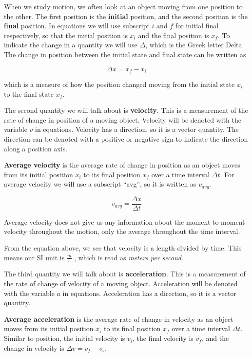 \documentclass[12pt]{book}
\begin{document}
When we study motion, we often look at an object moving from one position to the other. The first position is the \textbf{initial} position, and the second position is the \textbf{final} position. In equations we will use subscript $i$ and $f$ for initial final respectively, so that the initial position is $x_i$ and the final position is $x_f$. To indicate the change in a quantity we will use $\Delta$, which is the Greek letter Delta. The change in position between the initial state and final state can be written as

\begin{equation}
\Delta x = x_f - x_i
\end{equation}

which is a measure of how the position changed moving from the initial state $x_i$ to the final state $x_f$. 

The second quantity we will talk about is \textbf{velocity}. This is a measurement of the rate of change in position of a moving object.  Velocity will be denoted with the variable $v$ in equations. Velocity has a direction, so it is a vector quantity. The direction can be denoted with a positive or negative sign to indicate the direction along a position axis.

\textbf{Average velocity} is the average rate of change in position as an object moves from its initial position $x_i$ to its final position $x_f$ over a time interval $\Delta t$. For average velocity we will use a subscript ``avg'', so it is written as $v_{avg}$. 

\begin{equation}
v_{avg} = \frac{\Delta x}{\Delta t}
\end{equation}

Average velocity does not give us any information about the moment-to-moment velocity throughout the motion, only the average throughout the time interval.

From the equation above, we see that velocity is a length divided by time. This means our SI unit is $\frac{m}{s}$ , which is read as \textit{meters per second}. 

The third quantity we will talk about is \textbf{acceleration}. This is a measurement of the rate of change of velocity of a moving object. Acceleration will be denoted with the variable $a$ in equations. Acceleration has a direction, so it is a vector quantity. 

\textbf{Average acceleration} is the average rate of change in velocity as an object moves from its initial position $x_i$ to its final position $x_f$ over a time interval $\Delta t$. Similar to position, the initial velocity is $v_i$, the final velocity is $v_f$, and the change in velocity is $\Delta v = v_f - v_i$.
\end{document}
